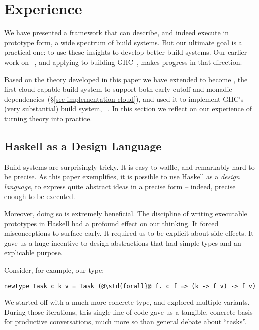 \section{Experience}\label{sec-experience}

We have presented a framework that can describe, and indeed execute in
prototype form, a wide spectrum of build systems.  But our ultimate
goal is a practical one: to use these insights to develop better
build systems. Our earlier work on \Shake~\cite{mitchell2012shake}, and applying
\Shake to building GHC~\cite{hadrian}, makes progress in that direction.

Based on the theory developed in this paper we have extended \Shake to
become \Cloud \Shake, the first cloud-capable build system to support
both early cutoff and monadic dependencies~(\S\ref{sec-implementation-cloud}),
and used it to implement GHC's (very substantial) build system,
\Hadrian~\cite{hadrian}. In this section we reflect on our experience of turning
theory into practice.

\vspace{-1mm}
\subsection{Haskell as a Design Language}\label{sec-design-lang}

Build systems are surprisingly tricky.  It is easy to waffle, and
remarkably hard to be precise. As this paper exemplifies, it is
possible to use Haskell as a \emph{design language}, to express quite
abstract ideas in a precise form -- indeed, precise enough to be executed.

Moreover, doing so is extremely beneficial.
The discipline of writing executable prototypes in
Haskell had a profound effect on our thinking. It forced misconceptions
to surface early.  It required us to be explicit about side effects.
It gave us a huge incentive to design abstractions that had simple types
and an explicable purpose.

Consider, for example, our  type:
\begin{verbatim}
newtype Task c k v = Task (@\std{forall}@ f. c f => (k -> f v) -> f v)
\end{verbatim}
We started off with a much more concrete type, and explored
multiple variants.  During those iterations, this single line of
code gave us a tangible, concrete basis for productive conversations,
much more so than general debate about ``tasks''.

